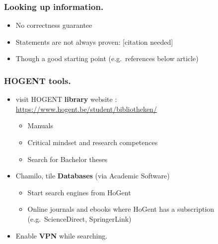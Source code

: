 \documentclass[aspectratio=169]{beamer}
\begin{document}
    \begin{frame}
        \frametitle{Looking up information.}
        
        
        {\pause}
        
        \begin{itemize}
            \item No correctness guarantee 
            \item Statements are not always proven: [citation needed]
            \item \alert{Though} a good starting point (e.g.\ references below article)
        \end{itemize}
    \end{frame}
    
    \begin{frame}
        \frametitle{HOGENT tools.}
        
        \begin{itemize}
            \item<+-> visit HOGENT \textbf{library} website : \url{https://www.hogent.be/student/bibliotheken/}
            \begin{itemize}
                \item Manuals
                \item Critical mindset and research competences 
                \item Search for Bachelor theses
            \end{itemize}
            \item<+-> Chamilo, tile \textbf{Databases} (via Academic Software)
            \begin{itemize}
                \item Start search engines from HoGent
                \item Online journals and ebooks where HoGent has a subscription (e.g.~ScienceDirect, SpringerLink)
            \end{itemize}
            \item<+-> Enable \textbf{VPN} while searching.
        \end{itemize}
    \end{frame}
    
\end{document}
